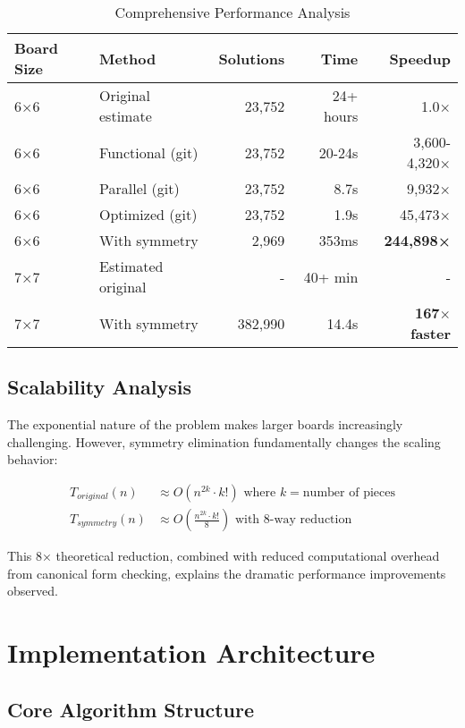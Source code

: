 \documentclass[12pt,a4paper]{article}
\theoremstyle{definition}
\begin{document}
\begin{table}[h]
\centering
\caption{Comprehensive Performance Analysis}
\begin{tabular}{@{}llrrr@{}}
\toprule
Board Size & Method & Solutions & Time & Speedup \\
\midrule
6$\times$6 & Original estimate & 23,752 & 24+ hours & 1.0× \\
6$\times$6 & Functional (git) & 23,752 & 20-24s & 3,600-4,320× \\
6$\times$6 & Parallel (git) & 23,752 & 8.7s & 9,932× \\
6$\times$6 & Optimized (git) & 23,752 & 1.9s & 45,473× \\
6$\times$6 & With symmetry & 2,969 & 353ms & \textbf{244,898×} \\
\midrule
7$\times$7 & Estimated original & - & 40+ min & - \\
7$\times$7 & With symmetry & 382,990 & 14.4s & \textbf{167$\times$ faster} \\
\bottomrule
\end{tabular}
\end{table}

\subsection{Scalability Analysis}

The exponential nature of the problem makes larger boards increasingly challenging. However, symmetry elimination fundamentally changes the scaling behavior:

\begin{align}
T_{original}(n) &\approx O(n^{2k} \cdot k!) \text{ where } k = \text{number of pieces} \\
T_{symmetry}(n) &\approx O\left(\frac{n^{2k} \cdot k!}{8}\right) \text{ with } 8 \text{-way reduction}
\end{align}

This 8× theoretical reduction, combined with reduced computational overhead from canonical form checking, explains the dramatic performance improvements observed.

\section{Implementation Architecture}

\subsection{Core Algorithm Structure}
\end{document}
